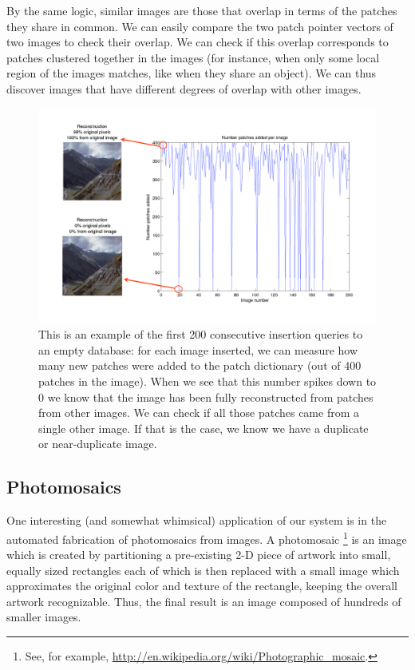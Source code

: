 By the same logic, similar images are those that overlap in terms of the patches they share in common. We can easily compare the two patch pointer vectors of two images to check their overlap. We can check if this overlap corresponds to patches clustered together in the images (for instance, when only some local region of the images matches, like when they share an object). We can thus discover images that have different degrees of overlap with other images.

 \begin{figure}
\hspace{-8mm}
\includegraphics[width=1.2\linewidth]{Figures/dupDetection.pdf}
\caption{This is an example of the first 200 consecutive insertion queries to an empty database: for each image inserted, we can measure how many new patches were added to the patch dictionary (out of 400 patches in the image). When we see that this number spikes down to 0 we know that the image has been fully reconstructed from patches from other images. We can check if all those patches came from a single other image. If that is the case, we know we have a duplicate or near-duplicate image. }
\label{fig:dups}
\end{figure}

\subsection{Photomosaics}\label{sec:photo}

One interesting (and somewhat whimsical) application of our system is in the automated fabrication of photomosaics from images.  A photomosaic \footnote{See, for example, \url{http://en.wikipedia.org/wiki/Photographic_mosaic}.} is an image which is created by partitioning a pre-existing 2-D piece of artwork into small, equally sized rectangles each of which is then replaced with a small image which approximates the original color and texture of the rectangle, keeping the overall artwork recognizable.  Thus, the final result is an image composed of hundreds of smaller images.

